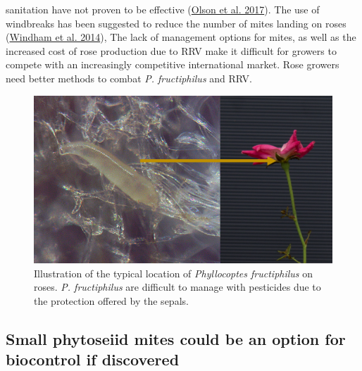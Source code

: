 \documentclass{ufdissertation}[overrideChapters] %
\begin{document}
{sanitation have not proven to be effective (\protect\hyperlink{ref-Olson2017}{Olson et al. 2017}). The use of windbreaks has been suggested to reduce the number of mites landing on roses (\protect\hyperlink{ref-Windham2014}{Windham et al. 2014}), The lack of management options for mites, as well as the increased cost of rose production due to RRV make it difficult for growers to compete with an increasingly competitive international market. Rose growers need better methods to combat \emph{P. fructiphilus} and RRV.
\begin{figure}

{\centering \includegraphics[width=1\linewidth]{figure/mite-pfruct-hide} 

}

\caption[Illustration of the typical location of \textit{Phyllocoptes fructiphilus} on roses.]{Illustration of the typical location of \textit{Phyllocoptes fructiphilus} on roses. \textit{P. fructiphilus} are difficult to manage with pesticides due to the protection offered by the sepals.}\label{fig:hiding}
\end{figure}
\hypertarget{small-phytoseiid-mites-could-be-an-option-for-biocontrol-if-discovered}{%
\subsection{Small phytoseiid mites could be an option for biocontrol if discovered}\label{small-phytoseiid-mites-could-be-an-option-for-biocontrol-if-discovered}}

}
\end{document}
